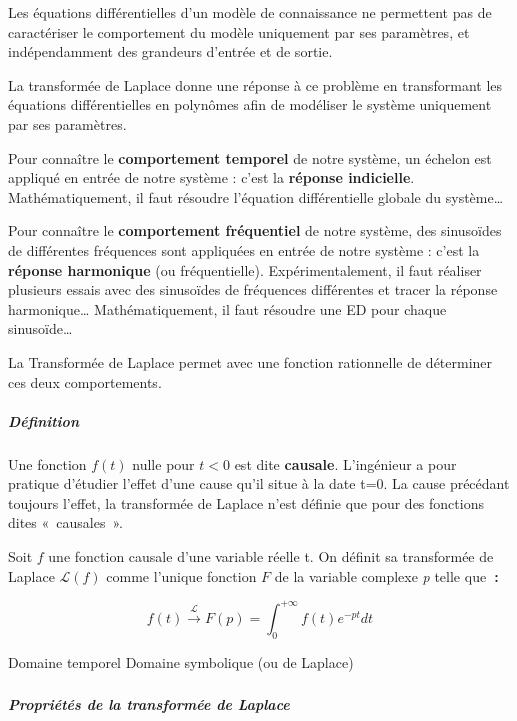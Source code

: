 Les équations différentielles d'un modèle de connaissance ne permettent pas de caractériser le comportement du modèle uniquement par ses paramètres, et indépendamment des grandeurs d'entrée et de sortie.

La transformée de Laplace donne une réponse à ce problème en transformant les équations différentielles en polynômes afin de modéliser le système uniquement par ses paramètres.

Pour connaître le \textbf{comportement temporel} de notre système, un échelon est appliqué en entrée de notre système : c'est la \textbf{réponse indicielle}. Mathématiquement, il faut résoudre l'équation différentielle globale du système\ldots{}

Pour connaître le \textbf{comportement fréquentiel} de notre système, des sinusoïdes de différentes fréquences sont appliquées en entrée de notre système : c'est la \textbf{réponse harmonique} (ou fréquentielle). Expérimentalement, il faut réaliser plusieurs essais avec des sinusoïdes de fréquences différentes et tracer la réponse harmonique\ldots{} Mathématiquement, il faut résoudre une ED pour chaque sinusoïde\ldots{}

La Transformée de Laplace permet avec une fonction rationnelle de déterminer ces deux comportements.

\hypertarget{duxe9finition}{%
\subparagraph*{Définition}\label{duxe9finition}}

Une fonction \(f(t)\) nulle pour \(t < 0\) est dite \textbf{causale}. L'ingénieur a pour pratique d'étudier l'effet d'une cause qu'il situe à la date t=0. La cause précédant toujours l'effet, la transformée de Laplace n'est définie que pour des fonctions dites «~causales~».

Soit \(f\) une fonction causale d'une variable réelle t. On définit sa transformée de Laplace \(\mathcal{L}(f)\) comme l'unique fonction \(F\) de la variable complexe \emph{p} telle que\textbf{~:}

\[f(t)\overset{\mathcal{L}}{\rightarrow}F(p) = \int_{0}^{+ \infty}{f(t)e^{- pt}}dt\]

Domaine temporel Domaine symbolique (ou de Laplace)

\hypertarget{section-1}{%
\subparagraph*{}\label{section-1}}

\hypertarget{propriuxe9tuxe9s-de-la-transformuxe9e-de-laplace}{%
\subparagraph*{Propriétés de la transformée de Laplace}\label{propriuxe9tuxe9s-de-la-transformuxe9e-de-laplace}}

